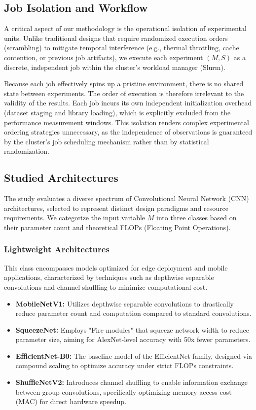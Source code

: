 \documentclass[acmsmall]{acmart}
\begin{document}
\subsection{Job Isolation and Workflow}

A critical aspect of our methodology is the operational isolation of experimental units. Unlike traditional designs that require randomized execution orders (scrambling) to mitigate temporal interference (e.g., thermal throttling, cache contention, or previous job artifacts), we execute each experiment $(M, S)$ as a discrete, independent job within the cluster's workload manager (Slurm).

Because each job effectively spins up a pristine environment, there is no shared state between experiments. The order of execution is therefore irrelevant to the validity of the results. Each job incurs its own independent initialization overhead (dataset staging and library loading), which is explicitly excluded from the performance measurement windows. This isolation renders complex experimental ordering strategies unnecessary, as the independence of observations is guaranteed by the cluster's job scheduling mechanism rather than by statistical randomization.

\subsection{Studied Architectures}

The study evaluates a diverse spectrum of Convolutional Neural Network (CNN) architectures, selected to represent distinct design paradigms and resource requirements. We categorize the input variable $M$ into three classes based on their parameter count and theoretical FLOPs (Floating Point Operations).

\subsubsection{Lightweight Architectures}
This class encompasses models optimized for edge deployment and mobile applications, characterized by techniques such as depthwise separable convolutions and channel shuffling to minimize computational cost.
\begin{itemize}
    \item \textbf{MobileNetV1:} Utilizes depthwise separable convolutions to drastically reduce parameter count and computation compared to standard convolutions.
    \item \textbf{SqueezeNet:} Employs "Fire modules" that squeeze network width to reduce parameter size, aiming for AlexNet-level accuracy with 50x fewer parameters.
    \item \textbf{EfficientNet-B0:} The baseline model of the EfficientNet family, designed via compound scaling to optimize accuracy under strict FLOPs constraints.
    \item \textbf{ShuffleNetV2:} Introduces channel shuffling to enable information exchange between group convolutions, specifically optimizing memory access cost (MAC) for direct hardware speedup.
\end{itemize}
\end{document}
